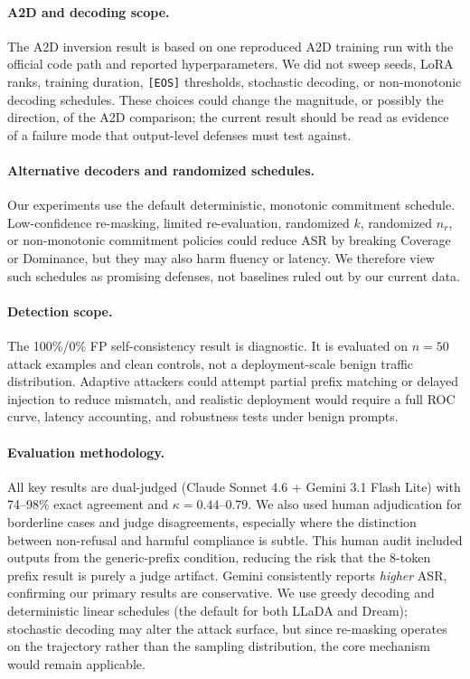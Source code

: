 \documentclass{article}
\theoremstyle{coloredthm}
\begin{document}
\paragraph{A2D and decoding scope.} The A2D inversion result is based on one reproduced A2D training run with the official code path and reported hyperparameters. We did not sweep seeds, LoRA ranks, training duration, \texttt{[EOS]} thresholds, stochastic decoding, or non-monotonic decoding schedules. These choices could change the magnitude, or possibly the direction, of the A2D comparison; the current result should be read as evidence of a failure mode that output-level defenses must test against.

\paragraph{Alternative decoders and randomized schedules.} Our experiments use the default deterministic, monotonic commitment schedule. Low-confidence re-masking, limited re-evaluation, randomized $k$, randomized $n_r$, or non-monotonic commitment policies could reduce ASR by breaking Coverage or Dominance, but they may also harm fluency or latency. We therefore view such schedules as promising defenses, not baselines ruled out by our current data.

\paragraph{Detection scope.} The 100\%/0\% FP self-consistency result is diagnostic. It is evaluated on $n{=}50$ attack examples and clean controls, not a deployment-scale benign traffic distribution. Adaptive attackers could attempt partial prefix matching or delayed injection to reduce mismatch, and realistic deployment would require a full ROC curve, latency accounting, and robustness tests under benign prompts.

\paragraph{Evaluation methodology.} All key results are dual-judged (Claude Sonnet 4.6 + Gemini 3.1 Flash Lite) with 74--98\% exact agreement and $\kappa{=}0.44$--$0.79$. We also used human adjudication for borderline cases and judge disagreements, especially where the distinction between non-refusal and harmful compliance is subtle. This human audit included outputs from the generic-prefix condition, reducing the risk that the 8-token prefix result is purely a judge artifact. Gemini consistently reports \textit{higher} ASR, confirming our primary results are conservative. We use greedy decoding and deterministic linear schedules (the default for both LLaDA and Dream); stochastic decoding may alter the attack surface, but since re-masking operates on the trajectory rather than the sampling distribution, the core mechanism would remain applicable.
\end{document}
